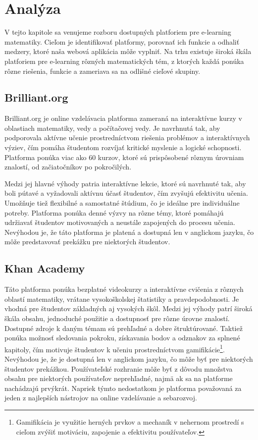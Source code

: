 \section{Analýza}
V tejto kapitole sa venujeme rozboru dostupných platforiem pre e-learning matematiky. 
Cieľom je identifikovať platformy, porovnať ich funkcie a odhaliť medzery, ktoré naša webová aplikácia môže vyplniť. 
Na trhu existuje široká škála platforiem pre e-learning rôzných matematických tém, 
z ktorých každá ponúka rôzne riešenia, funkcie a zameriava sa na odlišné cieľové skupiny.

\subsection{Brilliant.org}
Brilliant.org je online vzdelávacia platforma zameraná na interaktívne kurzy v oblastiach matematiky, vedy a počítačovej vedy.
Je navrhnutá tak, aby podporovala aktívne učenie prostredníctvom riešenia problémov a interaktívnych výziev, čím pomáha študentom rozvíjať kritické myslenie a logické schopnosti.
Platforma ponúka viac ako 60 kurzov, ktoré sú prispôsobené rôznym úrovniam znalostí, od začiatočníkov po pokročilých.

Medzi jej hlavné výhody patria interaktívne lekcie, ktoré sú navrhnuté tak, aby boli pútavé a vyžadovali aktívnu účasť študentov, čím zvyšujú efektivitu učenia.
Umožňuje tiež flexibilné a samostatné štúdium, čo je ideálne pre individuálne potreby. 
Platforma ponúka denné výzvy na rôzne témy, ktoré pomáhajú udržiavať študentov motivovaných a neustále zapojených do procesu učenia.
Nevýhodou je, že táto platforma je platená a dostupná len v anglickom jazyku, čo môže predstavovať prekážku pre niektorých študentov.
\cite{brilliant}
\subsection{Khan Academy}
Táto platforma ponúka bezplatné videokurzy a interaktívne cvičenia z rôznych oblastí matematiky, vrátane vysokoškolskej štatistiky a pravdepodobnosti.
Je vhodná pre študentov základných aj vysokých škôl. 
Medzi jej výhody patrí široká škála obsahu, jednoduché použitie a dostupnosť pre rôzne úrovne znalostí.
Dostupné zdroje k daným témam sú prehľadné a dobre štruktúrované.
Taktiež ponúka možnosť sledovania pokroku, získavania bodov a odznakov za splnené kapitoly, čím motivuje študentov k učeniu prostredníctvom gamifikácie\footnote{Gamifikácia je využitie herných prvkov a mechaník v nehernom prostredí s cieľom zvýšiť motiváciu, zapojenie a efektivitu používateľov.}.
Nevýhodou je, že je dostupná len v anglickom jazyku, čo môže byť pre niektorých študentov prekážkou. 
Používateľské rozhranie môže byť z dôvodu množstva obsahu pre niektorých používateľov neprehľadné, najmä ak sa na platforme nachádzajú prvýkrát. 
Napriek týmto nedostatkom je platforma považovaná za jeden z najlepších nástrojov na online vzdelávanie a sebarozvoj. \cite{khanacademy}
